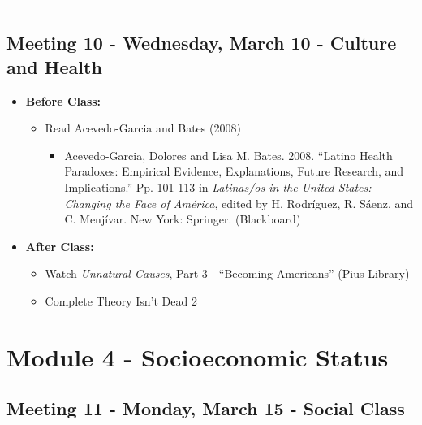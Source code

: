 \documentclass[
]{book}
\providecommand{\tightlist}{%
  \setlength{\itemsep}{0pt}\setlength{\parskip}{0pt}}
\begin{document}
\begin{center}\rule{0.5\linewidth}{0.5pt}\end{center}

\hypertarget{meeting-10---wednesday-march-10---culture-and-health}{%
\subsection*{Meeting 10 - Wednesday, March 10 - Culture and Health}\label{meeting-10---wednesday-march-10---culture-and-health}}

\begin{itemize}
\tightlist
\item
  \textbf{Before Class:}

  \begin{itemize}
  \tightlist
  \item
    Read Acevedo-Garcia and Bates (2008)

    \begin{itemize}
    \tightlist
    \item
      Acevedo-Garcia, Dolores and Lisa M. Bates. 2008. ``Latino Health Paradoxes: Empirical Evidence, Explanations, Future Research, and Implications.'' Pp. 101-113 in \emph{Latinas/os in the United States: Changing the Face of América}, edited by H. Rodríguez, R. Sáenz, and C. Menjívar. New York: Springer. (Blackboard)
    \end{itemize}
  \end{itemize}
\item
  \textbf{After Class:}

  \begin{itemize}
  \tightlist
  \item
    Watch \emph{Unnatural Causes}, Part 3 - ``Becoming Americans'' (Pius Library)
  \item
    Complete Theory Isn't Dead 2
  \end{itemize}
\end{itemize}

\newpage

\hypertarget{module-4---socioeconomic-status}{%
\section{Module 4 - Socioeconomic Status}\label{module-4---socioeconomic-status}}

\hypertarget{meeting-11---monday-march-15---social-class}{%
\subsection*{Meeting 11 - Monday, March 15 - Social Class}\label{meeting-11---monday-march-15---social-class}}
\end{document}
